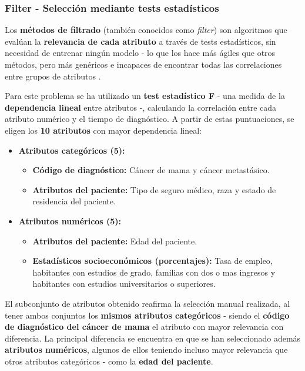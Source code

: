 \subsubsection{Filter - Selección mediante tests estadísticos}

Los \textbf{métodos de filtrado} (también conocidos como \textit{filter}) son algoritmos que evalúan la \textbf{relevancia de cada atributo} a través de tests estadísticos, sin necesidad de entrenar ningún modelo - lo que los hace más ágiles que otros métodos, pero más genéricos e incapaces de encontrar todas las correlaciones entre grupos de atributos \cite{featureselection}.

Para este problema se ha utilizado un \textbf{test estadístico F} - una medida de la \textbf{dependencia lineal} entre atributos -, calculando la correlación entre cada atributo numérico y el tiempo de diagnóstico. A partir de estas puntuaciones, se eligen los \textbf{10 atributos} con mayor dependencia lineal:

\begin{itemize}[parsep=1pt, itemsep=1pt, topsep=4pt]
	\item \textbf{Atributos categóricos (5):} 
	\begin{itemize}[parsep=1pt, itemsep=1pt, topsep=4pt]
		\item \textbf{Código de diagnóstico:} Cáncer de mama y cáncer metastásico.
		\item \textbf{Atributos del paciente:} Tipo de seguro médico, raza y estado de residencia del paciente.
	\end{itemize}
	\item \textbf{Atributos numéricos (5):}
	\begin{itemize}[parsep=1pt, itemsep=1pt, topsep=4pt]
		\item \textbf{Atributos del paciente:} Edad del paciente.
		\item \textbf{Estadísticos socioeconómicos (porcentajes):} Tasa de empleo, habitantes con estudios de grado, familias con dos o mas ingresos y habitantes con estudios universitarios o superiores.
	\end{itemize}
\end{itemize}

El subconjunto de atributos obtenido reafirma la selección manual realizada, al tener ambos conjuntos los \textbf{mismos atributos categóricos} - siendo el \textbf{código de diagnóstico del cáncer de mama} el atributo con mayor relevancia con diferencia. La principal diferencia se encuentra en que se han seleccionado además \textbf{atributos numéricos}, algunos de ellos teniendo incluso mayor relevancia que otros atributos categóricos - como la \textbf{edad del paciente}.

